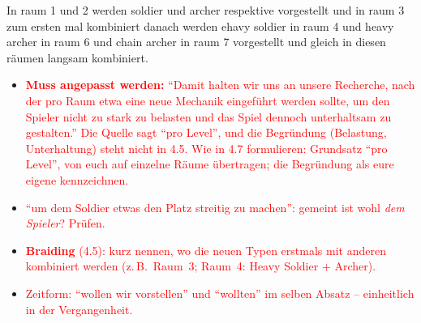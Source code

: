 \documentclass[../Main.tex]{subfiles}
\begin{document}
In raum 1 und 2 werden soldier und archer respektive vorgestellt und in raum 3 zum ersten mal kombiniert danach werden ehavy soldier in raum 4 und heavy archer in raum 6 und chain archer in raum 7 vorgestellt und gleich in diesen räumen langsam kombiniert.

\begin{itemize}[leftmargin=1.5cm]
    \item \textcolor{red}{\textbf{Muss angepasst werden:} \enquote{Damit halten wir uns an unsere Recherche, nach der pro Raum etwa eine neue Mechanik eingeführt werden sollte, um den Spieler nicht zu stark zu belasten und das Spiel dennoch unterhaltsam zu gestalten.} Die Quelle sagt \enquote{pro Level}, und die Begründung (Belastung, Unterhaltung) steht nicht in 4.5. Wie in 4.7 formulieren: Grundsatz \enquote{pro Level}, von euch auf einzelne Räume übertragen; die Begründung als eure eigene kennzeichnen.}
    \item \textcolor{red}{\enquote{um dem Soldier etwas den Platz streitig zu machen}: gemeint ist wohl \emph{dem Spieler}? Prüfen.}
    \item \textcolor{red}{\textbf{Braiding} (4.5): kurz nennen, wo die neuen Typen erstmals mit anderen kombiniert werden (z.\,B.\ Raum~3; Raum~4: Heavy Soldier + Archer).}
    \item \textcolor{red}{Zeitform: \enquote{wollen wir vorstellen} und \enquote{wollten} im selben Absatz -- einheitlich in der Vergangenheit.}
\end{itemize}
\end{document}
